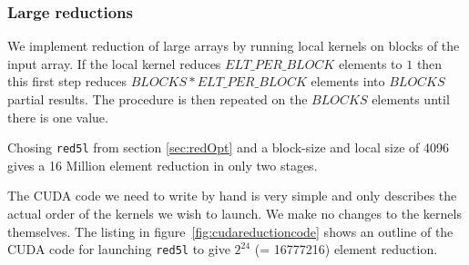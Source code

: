 \subsubsection{Large reductions}

We implement reduction of large arrays by running local kernels on blocks 
of the input array. If the local kernel reduces $ELT\_PER\_BLOCK$ elements to $1$ then 
this first step reduces $BLOCKS * ELT\_PER\_BLOCK$ elements into $BLOCKS$ partial results. 
The procedure is then repeated on the $BLOCKS$ elements until there is one 
value. 

Chosing {\tt red5l} from section \ref{sec:redOpt} and a block-size 
and local size of 4096 gives a 16 Million element reduction in only two stages. 

The CUDA code we need to write by hand is very simple and only describes the 
actual order of the kernels we wish to launch. We make no changes to the 
kernels themselves. The listing in figure~\ref{fig:cudareductioncode} shows an outline
of the CUDA code for launching {\tt red5l} to give $2^{24}$ (= 16777216)
element reduction.   

